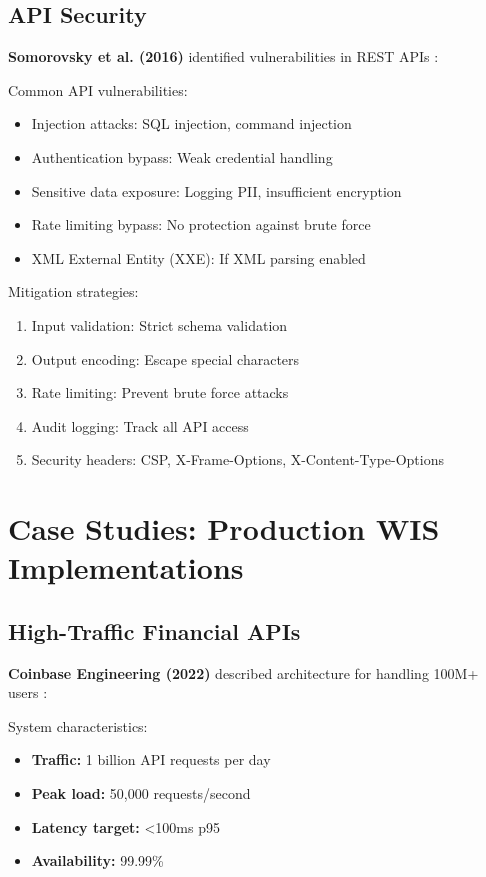 \documentclass[conference]{IEEEtran}
\begin{document}
\begin{enumerate}
\subsection{API Security}

\textbf{Somorovsky et al. (2016)} identified vulnerabilities in REST APIs \cite{somorovsky2016web}:

Common API vulnerabilities:
\begin{itemize}
    \item Injection attacks: SQL injection, command injection
    \item Authentication bypass: Weak credential handling
    \item Sensitive data exposure: Logging PII, insufficient encryption
    \item Rate limiting bypass: No protection against brute force
    \item XML External Entity (XXE): If XML parsing enabled
\end{itemize}

Mitigation strategies:
\begin{enumerate}
    \item Input validation: Strict schema validation
    \item Output encoding: Escape special characters
    \item Rate limiting: Prevent brute force attacks
    \item Audit logging: Track all API access
    \item Security headers: CSP, X-Frame-Options, X-Content-Type-Options
\end{enumerate}

\section{Case Studies: Production WIS Implementations}

\subsection{High-Traffic Financial APIs}

\textbf{Coinbase Engineering (2022)} described architecture for handling 100M+ users \cite{coinbase2022}:

System characteristics:
\begin{itemize}
    \item \textbf{Traffic:} 1 billion API requests per day
    \item \textbf{Peak load:} 50,000 requests/second
    \item \textbf{Latency target:} <100ms p95
    \item \textbf{Availability:} 99.99\%
\end{itemize}


\end{enumerate}
\end{document}
